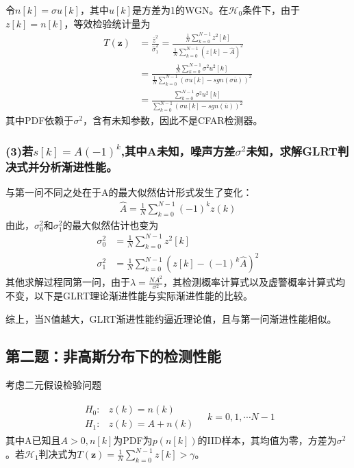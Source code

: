 \documentclass[fontset=windows]{article}
\numberwithin{figure}{section}
\begin{document}
令\(n[k]=\sigma u[k]\)，其中\(u[k]\)是方差为1的WGN。在\(\mathcal{H}_0\)条件下，由于\(z[k]=n[k]\)，等效检验统计量为
\begin{align*}
	T(\mathbf{z})
	 & =\frac{\overline{z}^2}{\hat{\sigma}^2_1}
	=\frac{\frac{1}{N}\sum_{k=0}^{N-1}z^2[k]}{\frac{1}{N}\sum_{k=0}^{N-1}(z[k]-\hat{A})^2}       \\
	 & =\frac{\frac{1}{N}\sum_{k=0}^{N-1}\sigma^2u^2[k]}
	{\frac{1}{N}\sum_{k=0}^{N-1}(\sigma u[k]-sgn(\sigma \overline{u}))^2}                        \\
	 & =\frac{\sum_{k=0}^{N-1}\sigma^2u^2[k]}{\sum_{k=0}^{N-1}(\sigma u[k]-sgn(\overline{u}))^2}
\end{align*}
其中PDF依赖于\(\sigma^2\)，含有未知参数，因此不是CFAR检测器。

\subsubsection*{(3)若\(s[k]=A(-1)^k\),其中A未知，噪声方差\(\sigma^2\)未知，求解GLRT判决式并分析渐进性能。}

与第一问不同之处在于A的最大似然估计形式发生了变化：
\begin{align*}
	\hat{A}=\frac{1}{N}\sum_{k=0}^{N-1}(-1)^kz(k)
\end{align*}
由此，\(\sigma^2_0\)和\(\sigma^2_1\)的最大似然估计也变为
\begin{align*}
	\sigma^2_0 & =\frac{1}{N}\sum_{k=0}^{N-1}z^2[k]                 \\
	\sigma^2_1 & =\frac{1}{N}\sum_{k=0}^{N-1}(z[k]-(-1)^k\hat{A})^2
\end{align*}
其他求解过程同第一问，由于\(\lambda=\frac{NA^2}{\sigma^2}\)，其检测概率计算式以及虚警概率计算式均不变，以下是GLRT理论渐进性能与实际渐进性能的比较。


综上，当N值越大，GLRT渐进性能约逼近理论值，且与第一问渐进性能相似。

\subsection{第二题：非高斯分布下的检测性能}
考虑二元假设检验问题

\begin{align*}
	\begin{matrix}
		H_0: & z(k)=n(k)   \\
		H_1: & z(k)=A+n(k)
	\end{matrix}\quad k=0,1,\cdots N-1
\end{align*}
其中A已知且\(A>0,n[k]\)为PDF为\(p(n[k])\)的IID样本，其均值为零，方差为\(\sigma^2\)。若\(\mathcal{H}_1\)判决式为\(T(\mathbf{z})=\frac{1}{N}\sum_{k=0}^{N-1}z[k]>\gamma\)。
\end{document}

